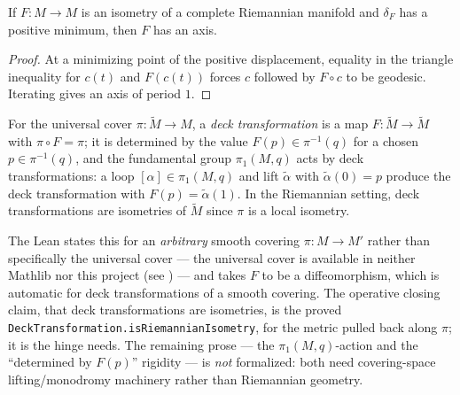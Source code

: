 \begin{lemma}
  \label{lem:pet-ch6-axis-existence}
  If $F:M\to M$ is an isometry of a complete Riemannian manifold and
  $\delta_F$ has a positive minimum, then $F$ has an axis.
\end{lemma}
\begin{proof}
  \sketch
  At a minimizing point of the positive displacement, equality in the triangle inequality for \(c(t)\) and \(F(c(t))\) forces \(c\) followed by \(F\circ c\) to be geodesic. Iterating gives an axis of period \(1\).
\end{proof}

\begin{definition}
  \label{def:pet-ch6-deck-transformation}
  \leanok
  For the universal cover $\pi:\tilde M\to M$, a \emph{deck transformation} is
  a map $F:\tilde M\to\tilde M$ with $\pi\circ F=\pi$; it is determined by the
  value $F(p)\in\pi^{-1}(q)$ for a chosen $p\in\pi^{-1}(q)$, and the
  fundamental group $\pi_1(M,q)$ acts by deck transformations: a loop
  $[\alpha]\in\pi_1(M,q)$ and lift $\tilde\alpha$ with
  $\tilde\alpha(0)=p$ produce the deck transformation with
  $F(p)=\tilde\alpha(1)$. In the Riemannian setting, deck transformations are
  isometries of $\tilde M$ since $\pi$ is a local isometry.

  The Lean states this for an \emph{arbitrary} smooth covering $\pi:M\to M'$
  rather than specifically the universal cover --- the universal cover is
  available in neither Mathlib nor this project (see
  ) --- and takes $F$ to be a diffeomorphism,
  which is automatic for deck transformations of a smooth covering. The
  operative closing claim, that deck transformations are isometries, is the
  proved \texttt{DeckTransformation.isRiemannianIsometry}, for the metric
  pulled back along $\pi$; it is the hinge 
  needs. The remaining prose --- the $\pi_1(M,q)$-action and the ``determined by
  $F(p)$'' rigidity --- is \emph{not} formalized: both need covering-space
  lifting/monodromy machinery rather than Riemannian geometry.
\end{definition}

